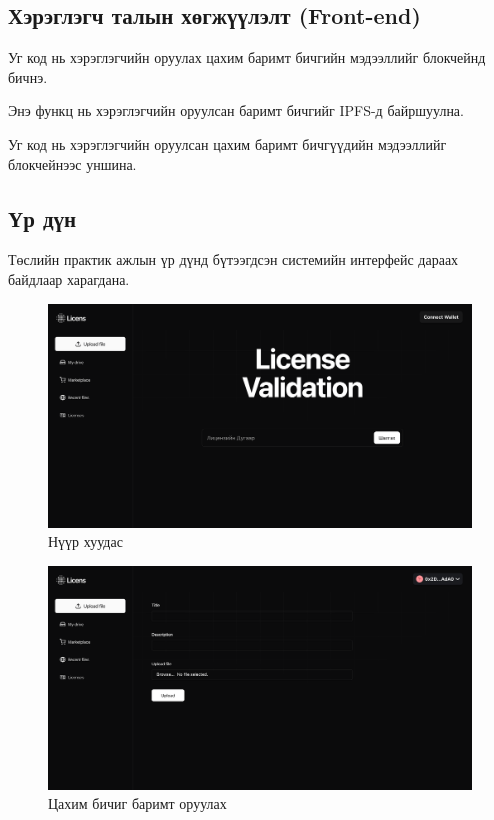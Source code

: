 \subsection{Хэрэглэгч талын хөгжүүлэлт (Front-end)}
Уг код нь хэрэглэгчийн оруулах цахим баримт бичгийн мэдээллийг блокчейнд бичнэ.


Энэ функц нь хэрэглэгчийн оруулсан баримт бичгийг IPFS-д байршуулна.


Уг код нь хэрэглэгчийн оруулсан цахим баримт бичгүүдийн мэдээллийг блокчейнээс уншина.



\pagebreak
\subsection{Үр дүн}
Төслийн практик ажлын үр дүнд бүтээгдсэн  системийн интерфейс дараах байдлаар харагдана.
\begin{figure}[h!]
	\centering
	\includegraphics[scale=0.155]{src/images/homepage.png}
	\caption{Нүүр хуудас}
\end{figure}

\begin{figure}[h!]
	\centering
	\includegraphics[scale=0.155]{src/images/upload-page.png}
	\caption{Цахим бичиг баримт оруулах}
\end{figure}

